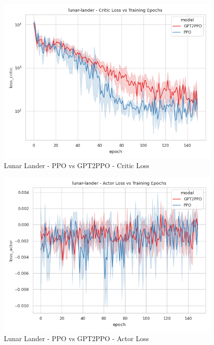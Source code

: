 \begin{figure}[htbp]
    \centerline{\includegraphics[width=\columnwidth]{./img/lunar-lander-loss_critic-model.png}}
    \caption{Lunar Lander - PPO vs GPT2PPO - Critic Loss}
    \label{lunar-lander-loss_critic-model}
\end{figure}
\begin{figure}[htbp]
    \centerline{\includegraphics[width=\columnwidth]{./img/lunar-lander-loss_actor-model.png}}
    \caption{Lunar Lander - PPO vs GPT2PPO - Actor Loss}
    \label{lunar-lander-loss_actor-model}
\end{figure}
